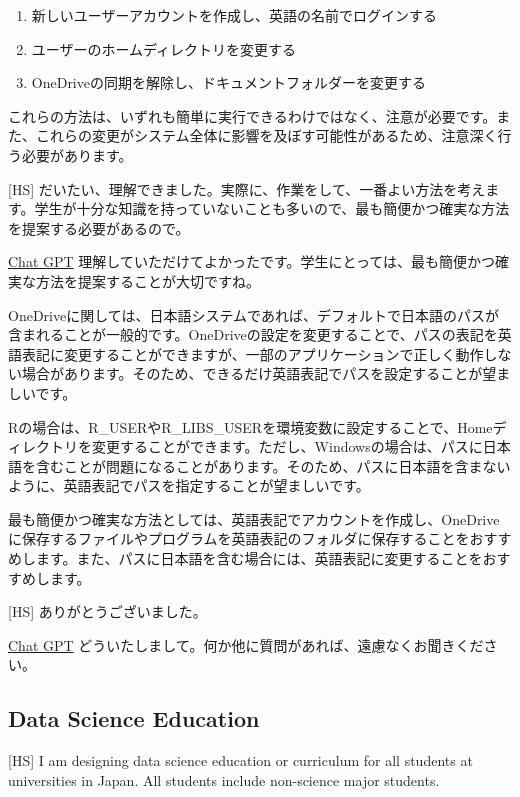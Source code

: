 \documentclass[
]{bxjsbook}
\providecommand{\tightlist}{%
  \setlength{\itemsep}{0pt}\setlength{\parskip}{0pt}}
\theoremstyle{definition}
\theoremstyle{definition}
\theoremstyle{definition}
\theoremstyle{definition}
\theoremstyle{remark}
\begin{document}
\begin{enumerate}
\def\labelenumi{\arabic{enumi}.}
\tightlist
\item
  新しいユーザーアカウントを作成し、英語の名前でログインする
\item
  ユーザーのホームディレクトリを変更する
\item
  OneDriveの同期を解除し、ドキュメントフォルダーを変更する
\end{enumerate}

これらの方法は、いずれも簡単に実行できるわけではなく、注意が必要です。また、これらの変更がシステム全体に影響を及ぼす可能性があるため、注意深く行う必要があります。

{[}HS{]} だいたい、理解できました。実際に、作業をして、一番よい方法を考えます。学生が十分な知識を持っていないことも多いので、最も簡便かつ確実な方法を提案する必要があるので。

\protect\hyperlink{chatgpt}{Chat GPT} 理解していただけてよかったです。学生にとっては、最も簡便かつ確実な方法を提案することが大切ですね。

OneDriveに関しては、日本語システムであれば、デフォルトで日本語のパスが含まれることが一般的です。OneDriveの設定を変更することで、パスの表記を英語表記に変更することができますが、一部のアプリケーションで正しく動作しない場合があります。そのため、できるだけ英語表記でパスを設定することが望ましいです。

Rの場合は、R\_USERやR\_LIBS\_USERを環境変数に設定することで、Homeディレクトリを変更することができます。ただし、Windowsの場合は、パスに日本語を含むことが問題になることがあります。そのため、パスに日本語を含まないように、英語表記でパスを指定することが望ましいです。

最も簡便かつ確実な方法としては、英語表記でアカウントを作成し、OneDriveに保存するファイルやプログラムを英語表記のフォルダに保存することをおすすめします。また、パスに日本語を含む場合には、英語表記に変更することをおすすめします。

{[}HS{]} ありがとうございました。

\protect\hyperlink{chatgpt}{Chat GPT} どういたしまして。何か他に質問があれば、遠慮なくお聞きください。

\hypertarget{dseducation}{%
\subsection{Data Science Education}\label{dseducation}}

{[}HS{]} I am designing data science education or curriculum for all students at universities in Japan. All students include non-science major students.
\end{document}
